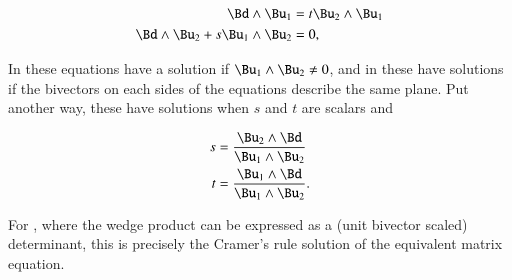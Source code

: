 \begin{dmath}\label{eqn:SimpleProducts2:1080}
\begin{aligned}
\Bd \wedge \Bu_1 &= t \Bu_2 \wedge \Bu_1 \\
\Bd \wedge \Bu_2 + s \Bu_1 \wedge \Bu_2 &= 0,
\end{aligned}
\end{dmath}

In  these equations have a solution if \( \Bu_1 \wedge \Bu_2 \ne 0 \), and in  these have solutions if the bivectors on each sides of the equations describe the same plane.  Put another way, these have solutions when \( s \) and \( t \) are scalars and

\begin{dmath}\label{eqn:SimpleProducts2:1100}
\begin{aligned}
s &= \frac{\Bu_2 \wedge \Bd}{\Bu_1 \wedge \Bu_2} \\
t &= \frac{\Bu_1 \wedge \Bd}{\Bu_1 \wedge \Bu_2}.
\end{aligned}
\end{dmath}

For ,
where the wedge product can be expressed as a (unit bivector scaled) determinant, this is precisely the Cramer's rule solution of the equivalent matrix equation.
